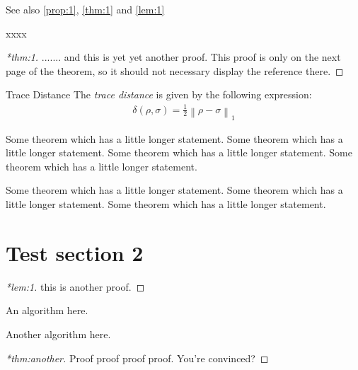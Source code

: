 \documentclass[12pt,a5paper]{article}
\begin{document}
See also \autoref{prop:1}, \autoref{thm:1} and \autoref{lem:1}

\cleardoublepage
xxxx
\begin{proof}[*thm:1]
  ....... and this is yet yet another proof.  This proof is only on the next page of the
  theorem, so it should not necessary display the reference there.
\end{proof}

\begin{thmheading}{Trace Distance}
  \label{thmheading:trace-dist}
  The \emph{trace distance} is given by the following expression:
  \begin{align}
    \delta(\rho,\sigma) = \frac12 \left\lVert \rho - \sigma \right\rVert_1
  \end{align}
\end{thmheading}

\begin{theorem}
  \label{thm:long}
  Some theorem which has a little longer statement.
  Some theorem which has a little longer statement.
  Some theorem which has a little longer statement.
  Some theorem which has a little longer statement.

  Some theorem which has a little longer statement.
  Some theorem which has a little longer statement.
  Some theorem which has a little longer statement.
\end{theorem}

\cleardoublepage

\section{Test section 2}

\begin{proof}[*lem:1]
  this is another proof.
\end{proof}

\begin{algorithm}
  \label{algo:1}
  An algorithm here.
\end{algorithm}

\begin{algorithm}
  \label{algo:2}
  Another algorithm here.
\end{algorithm}

\cleardoublepage

\begin{proof}[*thm:another]
  Proof proof proof proof. You're convinced?
\end{proof}
\end{document}
